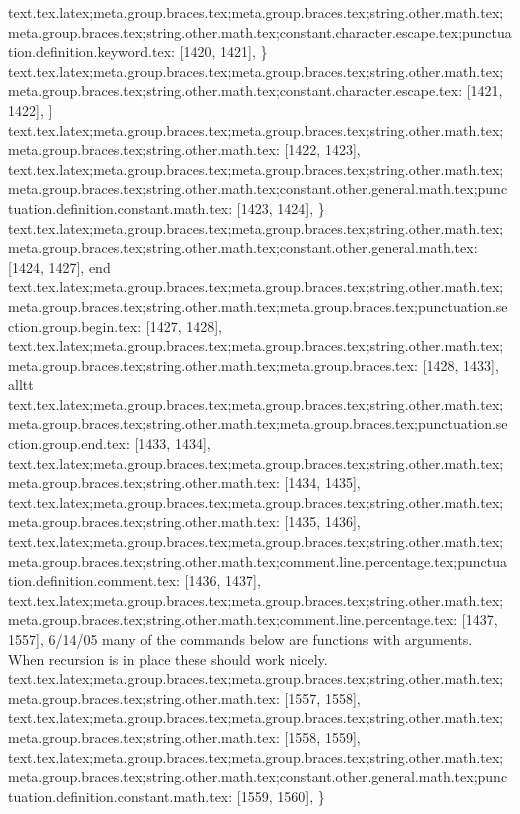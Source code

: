 {{{{{{{{{{{{{{{{{{{{{{{{{{{{{{{{{{{{text.tex.latex;meta.group.braces.tex;meta.group.braces.tex;string.other.math.tex;meta.group.braces.tex;string.other.math.tex;constant.character.escape.tex;punctuation.definition.keyword.tex: [1420, 1421], {\}
text.tex.latex;meta.group.braces.tex;meta.group.braces.tex;string.other.math.tex;meta.group.braces.tex;string.other.math.tex;constant.character.escape.tex: [1421, 1422], {]}
text.tex.latex;meta.group.braces.tex;meta.group.braces.tex;string.other.math.tex;meta.group.braces.tex;string.other.math.tex: [1422, 1423], {
}
text.tex.latex;meta.group.braces.tex;meta.group.braces.tex;string.other.math.tex;meta.group.braces.tex;string.other.math.tex;constant.other.general.math.tex;punctuation.definition.constant.math.tex: [1423, 1424], {\}
text.tex.latex;meta.group.braces.tex;meta.group.braces.tex;string.other.math.tex;meta.group.braces.tex;string.other.math.tex;constant.other.general.math.tex: [1424, 1427], {end}
text.tex.latex;meta.group.braces.tex;meta.group.braces.tex;string.other.math.tex;meta.group.braces.tex;string.other.math.tex;meta.group.braces.tex;punctuation.section.group.begin.tex: [1427, 1428], {{}
text.tex.latex;meta.group.braces.tex;meta.group.braces.tex;string.other.math.tex;meta.group.braces.tex;string.other.math.tex;meta.group.braces.tex: [1428, 1433], {alltt}
text.tex.latex;meta.group.braces.tex;meta.group.braces.tex;string.other.math.tex;meta.group.braces.tex;string.other.math.tex;meta.group.braces.tex;punctuation.section.group.end.tex: [1433, 1434], {}}
text.tex.latex;meta.group.braces.tex;meta.group.braces.tex;string.other.math.tex;meta.group.braces.tex;string.other.math.tex: [1434, 1435], {
}
text.tex.latex;meta.group.braces.tex;meta.group.braces.tex;string.other.math.tex;meta.group.braces.tex;string.other.math.tex: [1435, 1436], {
}
text.tex.latex;meta.group.braces.tex;meta.group.braces.tex;string.other.math.tex;meta.group.braces.tex;string.other.math.tex;comment.line.percentage.tex;punctuation.definition.comment.tex: [1436, 1437], {%
text.tex.latex;meta.group.braces.tex;meta.group.braces.tex;string.other.math.tex;meta.group.braces.tex;string.other.math.tex;comment.line.percentage.tex: [1437, 1557], { 6/14/05  many of the commands below are functions with arguments.  When recursion is in place these should work nicely.}
text.tex.latex;meta.group.braces.tex;meta.group.braces.tex;string.other.math.tex;meta.group.braces.tex;string.other.math.tex: [1557, 1558], {
}
text.tex.latex;meta.group.braces.tex;meta.group.braces.tex;string.other.math.tex;meta.group.braces.tex;string.other.math.tex: [1558, 1559], {
}
text.tex.latex;meta.group.braces.tex;meta.group.braces.tex;string.other.math.tex;meta.group.braces.tex;string.other.math.tex;constant.other.general.math.tex;punctuation.definition.constant.math.tex: [1559, 1560], {\}
}}}}}}}}}}}}}}}}}}}}}}}}}}}}}}}}}}}}}}}}
